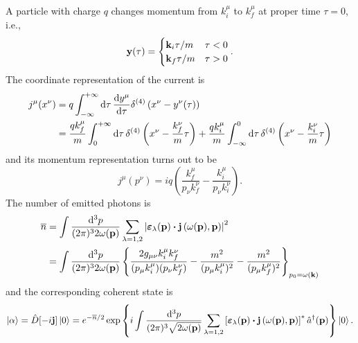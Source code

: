 \begin{example}[Bremsstrahlung]
	A particle with charge $q$ changes momentum from $k_i^\mu$ to $k_f^\mu$ at proper time $\tau=0$, i.e.,
	\begin{equation}
		\vb{y}(\tau)
		=
		\begin{cases}
			\vb{k}_i\tau/m
			&
			\tau<0
			\\
			\vb{k}_f\tau/m
			&
			\tau>0
		\end{cases}
		.
	\end{equation}
	The coordinate representation of the current is~\cite[p.~178]{Peskin1995}
	\begin{equation}
		\begin{split}
			j^\mu(x^\nu)
			&=
			q\int_{-\infty}^{+\infty}\dd{\tau}
			\dv{y^\mu}{\tau}
			\delta^{(4)}\left(
				x^\nu
				-
				y^\nu(\tau)
			\right)
			\\
			&=
			\frac{qk_f^\mu}{m}
			\int_0^{+\infty}\dd{\tau}
			\delta^{(4)}\left(x^\nu-\frac{k_f^\nu}{m}\tau\right)
			+
			\frac{qk_i^\mu}{m}
			\int_{-\infty}^0\dd{\tau}
			\delta^{(4)}\left(x^\nu-\frac{k_i^\nu}{m}\tau\right)
		\end{split}
	\end{equation}
	and its momentum representation turns out to be~\cite[p.~39]{Itzykson2012}
	\begin{equation*}
		j^\mu(p^\nu)
		=
		iq\left(
			\frac{k_f^\mu}{p_\nu k_f^\nu}
			-
			\frac{k_i^\mu}{p_\nu k_i^\nu}
		\right)
		.
	\end{equation*}
	The number of emitted photons is~\cite[p.~41]{Itzykson2012}
	\begin{equation*}
		\begin{split}
			\overline{n}
			&=
			\int\frac{\dd[3]{p}}{(2\pi)^32\omega(\vb{p})}
			\sum_{\lambda=1,2}
			\abs{
				\boldsymbol{\varepsilon}_\lambda(\vb{p})
				\vdot
				\vb{j}\left(\omega(\vb{p}),\vb{p}\right)
			}^2
			\\
			&=
			\int\frac{\dd[3]{p}}{(2\pi)^32\omega(\vb{p})}
			\left\{
				\frac{2g_{\mu\nu}k_i^\mu k_f^\nu}{(p_\mu k_i^\mu)(p_\nu k_f^\nu)}
				-
				\frac{m^2}{(p_\mu k_i^\mu)^2}
				-
				\frac{m^2}{(p_\mu k_f^\mu)^2}
			\right\}_{p_0=\omega(\vb{k})}
		\end{split}
	\end{equation*}
	and the corresponding coherent state is
	\begin{equation*}
		\ket{\alpha}
		=
		\hat{D}[-i\vb{j}]
		\ket{0}
		=
		e^{-\overline{n}/2}
		\exp\left\{
			i
			\int\frac{\dd[3]{p}}{(2\pi)^3\sqrt{2\omega(\vb{p})}}
			\sum_{\lambda=1,2}
			\left[
				\boldsymbol{\varepsilon}_\lambda(\vb{p})
				\vdot
				\vb{j}\left(\omega(\vb{p}),\vb{p}\right)
			\right]^*
			\hat{a}^\dagger(\vb{p})
		\right\}
		\ket{0}
		.
	\end{equation*}
\end{example}

